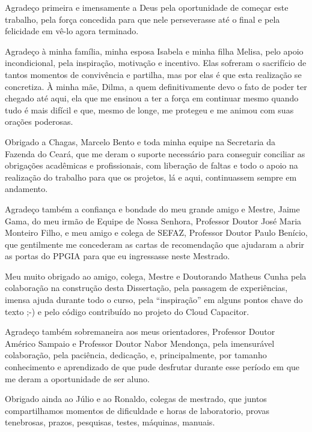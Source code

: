 \begin{agradecimentos}
Agradeço primeira e imensamente a Deus pela oportunidade de começar este trabalho, 
pela força concedida para que nele perseverasse até o final e pela felicidade em 
vê-lo agora terminado.

Agradeço à minha família, minha esposa Isabela e minha filha Melisa, pelo apoio
incondicional, pela inspiração, motivação e incentivo. Elas sofreram o 
sacrifício de tantos momentos de convivência e partilha, mas por elas é que
esta realização se concretiza. À minha mãe, Dilma, a quem definitivamente devo o 
fato de poder ter chegado até aqui, ela que me ensinou a ter a força em continuar 
mesmo quando tudo é mais difícil e que, mesmo de longe, me protegeu e me animou 
com suas orações poderosas.
 
Obrigado a Chagas, Marcelo Bento e toda minha equipe na Secretaria da 
Fazenda do Ceará, que me deram o suporte necessário para conseguir conciliar as 
obrigações acadêmicas e profissionais, com liberação de faltas e todo o apoio
na realização do trabalho para que os projetos, lá e aqui, continuassem sempre
em andamento.

Agradeço também a confiança e bondade do meu grande amigo e Mestre, Jaime Gama, 
do meu irmão de Equipe de Nossa Senhora, Professor Doutor José Maria Monteiro 
Filho, e meu amigo e colega de SEFAZ, Professor Doutor Paulo Benício,
que gentilmente me concederam as cartas de recomendação que ajudaram a abrir as
portas do PPGIA para que eu ingressasse neste Mestrado.

Meu muito obrigado ao amigo, colega, Mestre e Doutorando Matheus Cunha pela 
colaboração na construção desta Dissertação, pela passagem de experiências, 
imensa ajuda durante todo o curso, pela ``inspiração'' em alguns pontos chave do 
texto ;-) e pelo código contribuído no projeto do Cloud Capacitor.

Agradeço também sobremaneira aos meus orientadores, Professor Doutor Américo Sampaio
e Professor Doutor Nabor Mendonça, pela imensurável colaboração, pela paciência,
dedicação, e, principalmente, por tamanho conhecimento e aprendizado de que pude
desfrutar durante esse período em que me deram a oportunidade de ser aluno.

Obrigado ainda ao Júlio e ao Ronaldo, colegas de mestrado, que juntos
compartilhamos momentos de dificuldade e horas de laboratorio, provas tenebrosas,
prazos, pesquisas, testes, máquinas, manuais. 

\end{agradecimentos}
